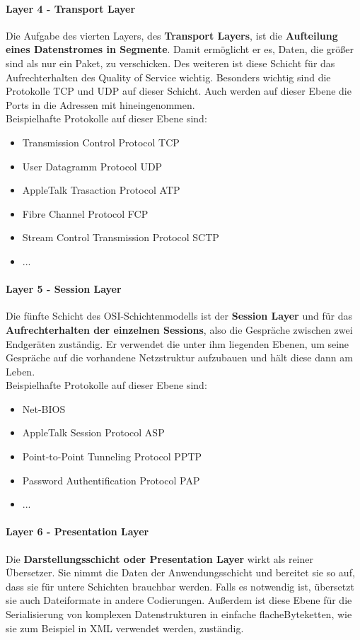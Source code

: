\documentclass[12pt,a4paper]{report}
\begin{document}
\paragraph{Layer 4 - Transport Layer}
Die Aufgabe des vierten Layers, des \textbf{Transport Layers}, ist die \textbf{Aufteilung eines Datenstromes in Segmente}. Damit ermöglicht er es, Daten, die größer sind als nur ein Paket, zu verschicken. Des weiteren ist diese Schicht für das Aufrechterhalten des Quality of Service wichtig. Besonders wichtig sind die Protokolle TCP und UDP auf dieser Schicht. Auch werden auf dieser Ebene die Ports in die Adressen mit hineingenommen.\\

Beispielhafte Protokolle auf dieser Ebene sind:
\begin{itemize}
\item Transmission Control Protocol TCP
\item User Datagramm Protocol UDP
\item AppleTalk Trasaction Protocol ATP
\item Fibre Channel Protocol FCP
\item Stream Control Transmission Protocol SCTP
\item ...
\end{itemize}

\paragraph{Layer 5 - Session Layer}
Die fünfte Schicht des OSI-Schichtenmodells ist der \textbf{Session Layer} und für das \textbf{Aufrechterhalten der einzelnen Sessions}, also die Gespräche zwischen zwei Endgeräten zuständig. Er verwendet die unter ihm liegenden Ebenen, um seine Gespräche auf die vorhandene Netzstruktur aufzubauen und hält diese dann am Leben.\\

Beispielhafte Protokolle auf dieser Ebene sind:
\begin{itemize}
\item Net-BIOS
\item AppleTalk Session Protocol ASP
\item Point-to-Point Tunneling Protocol PPTP
\item Password Authentification Protocol PAP
\item ...
\end{itemize}

\paragraph{Layer 6 - Presentation Layer}
Die \textbf{Darstellungsschicht oder Presentation Layer} wirkt als reiner Übersetzer. Sie nimmt die Daten der Anwendungsschicht und bereitet sie so auf, dass sie für untere Schichten brauchbar werden. Falls es notwendig ist, übersetzt sie auch Dateiformate in andere Codierungen. Außerdem ist diese Ebene für die Serialisierung von komplexen Datenstrukturen in einfache \glqq flache\grqq  Byteketten, wie sie zum Beispiel in XML verwendet werden, zuständig.\\
\end{document}
